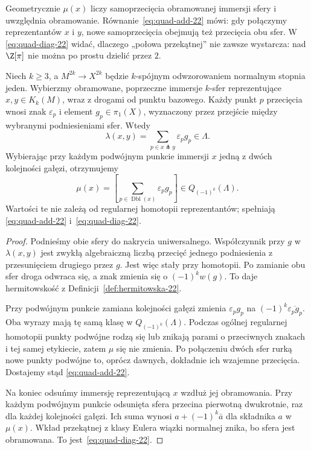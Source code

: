 Geometrycznie $\mu(x)$ liczy samoprzecięcia
obramowanej immersji sfery i uwzględnia obramowanie.
Równanie~\eqref{eq:quad-add-22} mówi:
gdy połączymy reprezentantów $x$ i $y$, nowe
samoprzecięcia obejmują też przecięcia obu sfer.
W \eqref{eq:quad-diag-22} widać, dlaczego
„połowa przekątnej” nie zawsze wystarcza:
nad $\Z[\pi]$ nie można po prostu dzielić przez $2$.

\begin{stwierdzenie}
\label{prop:rachunek-przeciec-Wall-22}
Niech $k\geq3$, a $M^{2k}\to X^{2k}$ będzie
$k$-spójnym odwzorowaniem normalnym stopnia jeden.
Wybierzmy obramowane, poprzeczne immersje
$k$-sfer reprezentujące $x,y\in K_k(M)$,
wraz z drogami od punktu bazowego. Każdy punkt
$p$ przecięcia wnosi znak $\varepsilon_p$ i element
$g_p\in\pi_1(X)$, wyznaczony przez przejście
między wybranymi podniesieniami sfer. Wtedy
\[
 \lambda(x,y)=\sum_{p\in x\pitchfork y}
                  \varepsilon_p g_p\in\Lambda.
\]
Wybierając przy każdym podwójnym punkcie immersji
$x$ jedną z dwóch kolejności gałęzi, otrzymujemy
\[
 \mu(x)=\left[\sum_{p\in\operatorname{Dbl}(x)}
                 \varepsilon_p g_p\right]
                 \in Q_{(-1)^k}(\Lambda).
\]
Wartości te nie zależą od regularnej homotopii
reprezentantów; spełniają
\eqref{eq:quad-add-22} i~\eqref{eq:quad-diag-22}.
\end{stwierdzenie}
\begin{proof}
Podnieśmy obie sfery do nakrycia uniwersalnego.
Współczynnik przy $g$ w $\lambda(x,y)$ jest
zwykłą algebraiczną liczbą przecięć jednego
podniesienia z przesunięciem drugiego przez $g$.
Jest więc stały przy homotopii. Po zamianie
obu sfer droga odwraca się, a znak zmienia się
o $(-1)^k w(g)$. To daje hermitowskość z
Definicji~\ref{def:hermitowska-22}.

Przy podwójnym punkcie zamiana kolejności
gałęzi zmienia $\varepsilon_p g_p$ na
$(-1)^k\overline{\varepsilon_p g_p}$.
Oba wyrazy mają tę samą klasę w
$Q_{(-1)^k}(\Lambda)$. Podczas ogólnej regularnej
homotopii punkty podwójne rodzą się lub znikają
parami o przeciwnych znakach i tej samej
etykiecie, zatem $\mu$ się nie zmienia.
Po połączeniu dwóch sfer rurką nowe punkty
podwójne to, oprócz dawnych, dokładnie ich
wzajemne przecięcia. Dostajemy stąd
\eqref{eq:quad-add-22}.

Na koniec odsuńmy immersję reprezentującą $x$
wzdłuż jej obramowania. Przy każdym podwójnym
punkcie odsunięta sfera przecina pierwotną
dwukrotnie, raz dla każdej kolejności gałęzi.
Ich suma wynosi $a+(-1)^k\bar a$ dla składnika
$a$ w $\mu(x)$. Wkład przekątnej z klasy Eulera
wiązki normalnej znika, bo sfera jest obramowana.
To jest~\eqref{eq:quad-diag-22}.
\end{proof}

